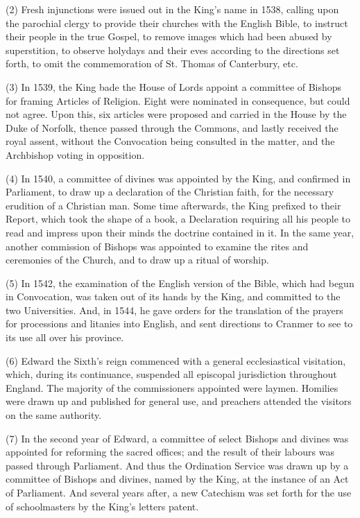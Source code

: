 (2) Fresh injunctions were
issued out in the King's name in 1538, calling upon the parochial
clergy to provide their churches with the English Bible, to instruct
their people in the true Gospel, to remove images which had been
abused by superstition, to observe holydays and their eves according
to the directions set forth, to omit the commemoration of St. Thomas
of Canterbury, etc.

(3) In 1539, the King bade the
House of Lords appoint a committee of Bishops for framing Articles of
Religion. Eight were nominated in consequence, but could not agree.
Upon this, six articles were proposed and carried in the House by the
Duke of Norfolk, thence passed through the Commons, and lastly
received the royal assent, without the Convocation being consulted in
the matter, and the Archbishop voting in opposition.

(4) In 1540, a committee of
divines was appointed by the King, and confirmed in Parliament, to
draw up a declaration of the Christian faith, for the necessary
erudition of a Christian man. Some time afterwards, the King prefixed
to their Report, which took the shape of a book, a Declaration
requiring all his people to read and impress upon their minds the
doctrine contained in it. In the same year, another commission of
Bishops was appointed to examine the rites and ceremonies of the
Church, and to draw up a ritual of worship.

(5) In 1542, the examination
of the English version of the Bible, which had begun in Convocation,
was taken out of its hands by the King, and committed to the two
Universities. And, in 1544, he gave orders for the translation of the
prayers for processions and litanies into English, and sent
directions to Cranmer to see to its use all over his province.

(6) Edward the Sixth's reign
commenced with a general ecclesiastical visitation, which, during its
continuance, suspended all episcopal jurisdiction throughout England.
The majority of the commissioners appointed were laymen. Homilies were
drawn up and published for general use, and preachers attended the
visitors on the same authority.

(7) In the second year of
Edward, a committee of select Bishops and divines was appointed for
reforming the sacred offices; and the result of their labours was
passed through Parliament. And thus the Ordination Service was drawn
up by a committee of Bishops and divines, named by the King, at the
instance of an Act of Parliament. And several years after, a new
Catechism was set forth for the use of schoolmasters by the King's
letters patent.

